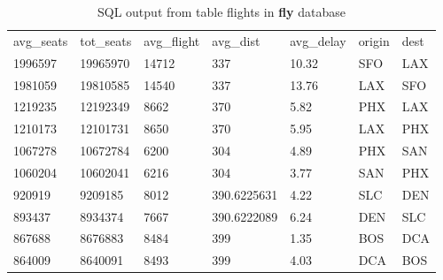 \documentclass[a4paper,
							12pt,
							oneside,
							openright,
							DIV10,
							numbers=noendperiod
							]{scrreprt} %
\begin{document}
\begin{table}[ht]
\centering
\caption{SQL output from table flights in \textbf{fly} database}
\label{tab:my-table}
\begin{tabular}{lllllll}
{\color[HTML]{000000} avg\_seats} & {\color[HTML]{000000} tot\_seats} & {\color[HTML]{000000} avg\_flight} & {\color[HTML]{000000} avg\_dist} & {\color[HTML]{000000} avg\_delay} & {\color[HTML]{000000} origin} & {\color[HTML]{000000} dest} \\
{\color[HTML]{000000} 1996597} & {\color[HTML]{000000} 19965970} & {\color[HTML]{000000} 14712} & {\color[HTML]{000000} 337} & {\color[HTML]{000000} 10.32} & {\color[HTML]{000000} SFO} & {\color[HTML]{000000} LAX} \\
{\color[HTML]{000000} 1981059} & {\color[HTML]{000000} 19810585} & {\color[HTML]{000000} 14540} & {\color[HTML]{000000} 337} & {\color[HTML]{000000} 13.76} & {\color[HTML]{000000} LAX} & {\color[HTML]{000000} SFO} \\
{\color[HTML]{000000} 1219235} & {\color[HTML]{000000} 12192349} & {\color[HTML]{000000} 8662} & {\color[HTML]{000000} 370} & {\color[HTML]{000000} 5.82} & {\color[HTML]{000000} PHX} & {\color[HTML]{000000} LAX} \\
{\color[HTML]{000000} 1210173} & {\color[HTML]{000000} 12101731} & {\color[HTML]{000000} 8650} & {\color[HTML]{000000} 370} & {\color[HTML]{000000} 5.95} & {\color[HTML]{000000} LAX} & {\color[HTML]{000000} PHX} \\
{\color[HTML]{000000} 1067278} & {\color[HTML]{000000} 10672784} & {\color[HTML]{000000} 6200} & {\color[HTML]{000000} 304} & {\color[HTML]{000000} 4.89} & {\color[HTML]{000000} PHX} & {\color[HTML]{000000} SAN} \\
{\color[HTML]{000000} 1060204} & {\color[HTML]{000000} 10602041} & {\color[HTML]{000000} 6216} & {\color[HTML]{000000} 304} & {\color[HTML]{000000} 3.77} & {\color[HTML]{000000} SAN} & {\color[HTML]{000000} PHX} \\
{\color[HTML]{000000} 920919} & {\color[HTML]{000000} 9209185} & {\color[HTML]{000000} 8012} & {\color[HTML]{000000} 390.6225631} & {\color[HTML]{000000} 4.22} & {\color[HTML]{000000} SLC} & {\color[HTML]{000000} DEN} \\
{\color[HTML]{000000} 893437} & {\color[HTML]{000000} 8934374} & {\color[HTML]{000000} 7667} & {\color[HTML]{000000} 390.6222089} & {\color[HTML]{000000} 6.24} & {\color[HTML]{000000} DEN} & {\color[HTML]{000000} SLC} \\
{\color[HTML]{000000} 867688} & {\color[HTML]{000000} 8676883} & {\color[HTML]{000000} 8484} & {\color[HTML]{000000} 399} & {\color[HTML]{000000} 1.35} & {\color[HTML]{000000} BOS} & {\color[HTML]{000000} DCA} \\
{\color[HTML]{000000} 864009} & {\color[HTML]{000000} 8640091} & {\color[HTML]{000000} 8493} & {\color[HTML]{000000} 399} & {\color[HTML]{000000} 4.03} & {\color[HTML]{000000} DCA} & {\color[HTML]{000000} BOS}
\end{tabular}
\end{table}
\end{document}
